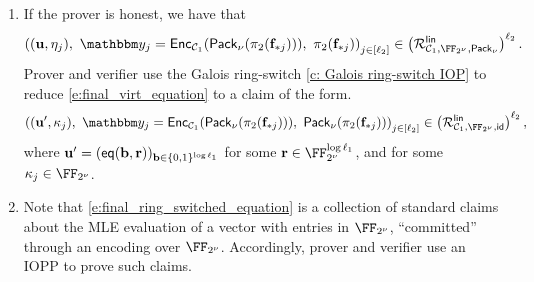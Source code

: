 \documentclass[11pt,letterpaper,usenames,dvipsnames]{article}
\begin{document}
\begin{construction}
\begin{enumerate}[leftmargin=*]
Note that \eqref{e:virtual_IOPP_intermediate} holds if and only if, for all $j\in [\codedim_2]$,
%
\begin{align*}
\eta_j &=\sum_{i\in [\codedim_1']} \vv_i \cdot \pi_2(\bfh_{ij}) = \sum_{i\in [\codedim_1']} \vv_i \cdot \sum_{t\in [\codedim_1]} M_{0it}\cdot \pi_2(\bff_{tj})\\ =& \sum_{t\in [\codedim_1]} \left(\sum_{i\in[\codedim_1']}M_{0it}\cdot \vv_i\right)\cdot \pi_2(\bff_{tj}) = \langle \uu_j , \pi_2(\bff_{*j})\rangle,
\end{align*}
where $\uu \in \comfield^{\codedim_1}$ is the vector whose $t$-th entry is
%
$$
\uu_t = \langle \vv, M_{0*t}\rangle \in \comfield,
$$
and  $M_{0*t}\in \comfield^{\codedim_1'}$ denotes the $t$-th column of $M_0$, for $t\in [\codedim_1]$,
%

%
Note that, if $\Pi_{\mathsf{red}}^{\codedim_2}$ is as in \cref{?}, then $\vv= (\mathsf{eq}(\bb,\rr))_{\bb\in \{0,1\}^{\log \codedim_1'}}$ for some $\rr\in \comfield^{\log \codedim_1'}$, and then 
$
\uu_t = \mle{M_{0*t}}(\rr) \in \comfield. 
$
%

\item If the prover is honest, we have that
%
\begin{equation}\label{e:final_virt_equation}
\left((\uu, \eta_j),\ \oracle_j = \Enc_{\cC_1}(\pack(\pi_2(\bff_{*j}))), \ \pi_2(\bff_{*j})\right)_{j\in [\codedim_2]} \in \left(\Relation^{\mathsf{lin}}_{\cC_1, \comfield,\pack}\right)^{\codedim_2}.
\end{equation}
%
Prover and verifier use the Galois ring-switch \cref{c: Galois ring-switch IOP} to reduce  \eqref{e:final_virt_equation} to a claim of the form.
\begin{equation}\label{e:final_ring_switched_equation}
\left((\uu', \kappa_j),\ \oracle_j = \Enc_{\cC_1}(\pack(\pi_2(\bff_{*j}))), \ \pack(\pi_2(\bff_{*j}))\right)_{j\in [\codedim_2]} \in \left(\Relation^{\mathsf{lin}}_{\cC_1, \comfield,\mathsf{id}}\right)^{\codedim_2},
\end{equation}
where $\mathbf{u}'=(\mathsf{eq}(\mathbf{b},\mathbf{r}))_{\mathbf{b}\in \{0,1\}^{\log \ell_1}}$ for some $\rr\in \comfield^{\log \codedim_1}$, and for some $\kappa_j\in \comfield$.
\item Note that \eqref{e:final_ring_switched_equation} is a collection of standard claims about the MLE evaluation of a vector with entries in $\comfield$, ``committed'' through an encoding over $\comfield$. Accordingly, prover and verifier use an IOPP to prove such claims.
%
 \end{enumerate}
%
\end{construction}
\end{document}
